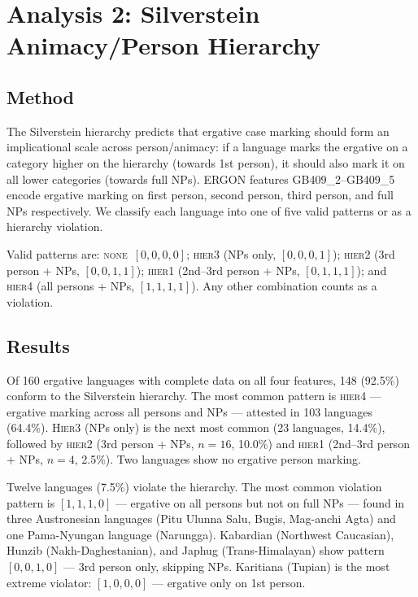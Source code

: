 \documentclass[12pt, a4paper]{article}
\begin{document}
\section{Analysis 2: Silverstein Animacy/Person Hierarchy}

\subsection{Method}

The Silverstein hierarchy \citep{silverstein1976, dixon1979} predicts that
ergative case marking should form an implicational scale across person/animacy:
if a language marks the ergative on a category higher on the hierarchy (towards
1st person), it should also mark it on all lower categories (towards full NPs).
ERGON features GB409\_2--GB409\_5 encode ergative marking on first person, second
person, third person, and full NPs respectively. We classify each language into
one of five valid patterns or as a hierarchy violation.

Valid patterns are: \textsc{none}~$[0,0,0,0]$; \textsc{hier3} (NPs only,
$[0,0,0,1]$); \textsc{hier2} (3rd person + NPs, $[0,0,1,1]$); \textsc{hier1}
(2nd--3rd person + NPs, $[0,1,1,1]$); and \textsc{hier4} (all persons + NPs,
$[1,1,1,1]$). Any other combination counts as a violation.

\subsection{Results}

Of 160 ergative languages with complete data on all four features, 148 (92.5\%)
conform to the Silverstein hierarchy. The most common pattern is \textsc{hier4}
--- ergative marking across all persons and NPs --- attested in 103 languages
(64.4\%). \textsc{Hier3} (NPs only) is the next most common (23 languages,
14.4\%), followed by \textsc{hier2} (3rd person + NPs, $n = 16$, 10.0\%) and
\textsc{hier1} (2nd--3rd person + NPs, $n = 4$, 2.5\%). Two languages show no
ergative person marking.

Twelve languages (7.5\%) violate the hierarchy. The most common violation pattern
is $[1,1,1,0]$ --- ergative on all persons but not on full NPs --- found in three
Austronesian languages (Pitu Ulunna Salu, Bugis, Mag-anchi Agta) and one
Pama-Nyungan language (Narungga). Kabardian (Northwest Caucasian), Hunzib
(Nakh-Daghestanian), and Japhug (Trans-Himalayan) show pattern $[0,0,1,0]$ ---
3rd person only, skipping NPs. Karitiana (Tupian) is the most extreme violator:
$[1,0,0,0]$ --- ergative only on 1st person.
\end{document}
